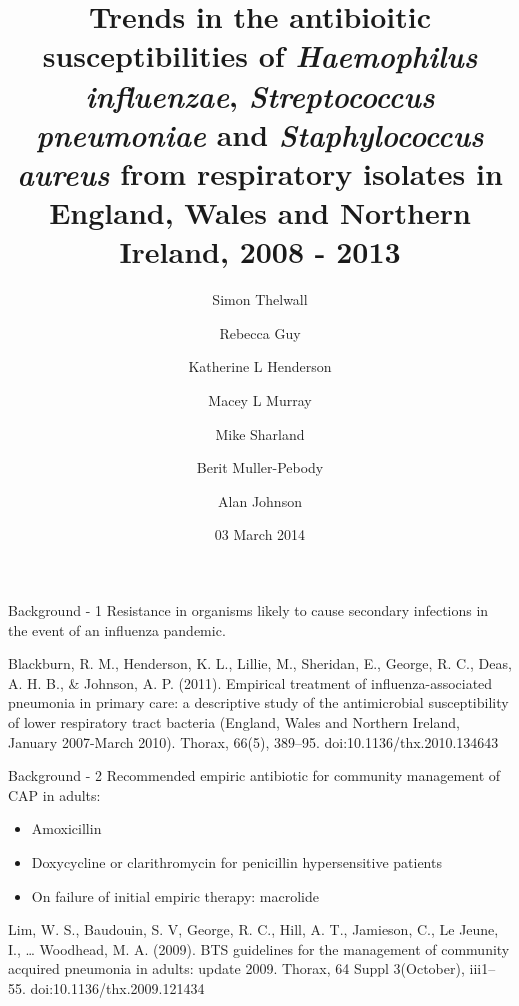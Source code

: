 \documentclass{beamer}
\title[Trends in susceptibility of \textit{H. influenzae}, \textit{S. pneumoniae} and \textit{S. aureus} from respiratory isolates]{Trends in the antibioitic susceptibilities of \textit{Haemophilus influenzae}, \textit{Streptococcus pneumoniae} and \textit{Staphylococcus aureus} from respiratory isolates in England, Wales and Northern Ireland, 2008 - 2013}
\subtitle{}
\author{Simon Thelwall\inst{1}
\and
Rebecca Guy\inst{1}
\and Katherine L Henderson\inst{1}
\and Macey L Murray\inst{2}
\and Mike Sharland\inst{3}
\and Berit Muller-Pebody\inst{1} 
\and Alan Johnson\inst{1}}
\institute[Public Health England] %
{
  \inst{1}%
  Department of Healthcare Associated Infections and Antimicrobial Resistance, Centre for Disease Surveillance and Control, Public Health England
  \\
  \inst{2}%
  Centre for Paediatric Pharmacy Research, Department of Practice and Policy, UCL School of Pharmacy, University College London, London, UK
  \\
  \inst{3}%
  Paediatric Infectious Diseases Unit, St George's Hospital NHS Trust, London, UK
}
\date{03 March 2014}
\begin{document}
{ %
\begin{frame}
\maketitle
\end{frame}
}
\addtocounter{framenumber}{-1}

\begin{frame}{Background - 1}
Resistance in organisms likely to cause secondary infections in the event of an influenza pandemic. 
\begin{thebibliography}{Blackburn et al, 2011}
{\footnotesize
Blackburn, R. M., Henderson, K. L., Lillie, M., Sheridan, E., George, R. C., Deas, A. H. B., \& Johnson, A. P. (2011). 
\newblock Empirical treatment of influenza-associated pneumonia in primary care: a descriptive study of the antimicrobial susceptibility of lower respiratory tract bacteria (England, Wales and Northern Ireland, January 2007-March 2010). 
\newblock Thorax, 66(5), 389–95. doi:10.1136/thx.2010.134643
}
\end{thebibliography}
\end{frame}

\begin{frame}{Background - 2}
Recommended empiric antibiotic for community management of CAP in adults:
\begin{itemize}
\item Amoxicillin 
\item Doxycycline or clarithromycin for penicillin hypersensitive patients
\item On failure of initial empiric therapy: macrolide
\end{itemize}
\begin{thebibliography}{Lim et al, 2009}
{\footnotesize
Lim, W. S., Baudouin, S. V, George, R. C., Hill, A. T., Jamieson, C., Le Jeune, I., … Woodhead, M. A. (2009). 
\newblock BTS guidelines for the management of community acquired pneumonia in adults: update 2009. 
\newblock Thorax, 64 Suppl 3(October), iii1–55. doi:10.1136/thx.2009.121434
}
\end{thebibliography}
\end{frame}
\end{document}
